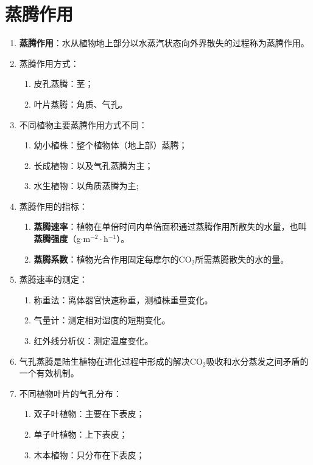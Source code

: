 \section{蒸腾作用}
\begin{enumerate}
    \item \textbf{蒸腾作用}：水从植物地上部分以水蒸汽状态向外界散失的过程称为蒸腾作用。
    \item 蒸腾作用方式：
    \begin{enumerate}
        \item 皮孔蒸腾：茎；
        \item 叶片蒸腾：角质、气孔。
    \end{enumerate}
    \item 不同植物主要蒸腾作用方式不同：
    \begin{enumerate}
        \item 幼小植株：整个植物体（地上部）蒸腾；
        \item 长成植物：以及气孔蒸腾为主；
        \item 水生植物：以角质蒸腾为主;
    \end{enumerate}
    \item 蒸腾作用的指标：
    \begin{enumerate}
        \item \textbf{蒸腾速率}：植物在单倍时间内单倍面积通过蒸腾作用所散失的水量，也叫\textbf{蒸腾强度}（g$\cdot$m$^{-2}\cdot$h$^{-1}$）。
        \item \textbf{蒸腾系数}：植物光合作用固定每摩尔的CO$_2$所需蒸腾散失的水的量。
    \end{enumerate}
    \item 蒸腾速率的测定：
    \begin{enumerate}
        \item 称重法：离体器官快速称重，测植株重量变化。
        \item 气量计：测定相对湿度的短期变化。
        \item 红外线分析仪：测定温度变化。
    \end{enumerate}
    \item 气孔蒸腾是陆生植物在进化过程中形成的解决CO$_2$吸收和水分蒸发之间矛盾的一个有效机制。
    \item 不同植物叶片的气孔分布：
    \begin{enumerate}
        \item 双子叶植物：主要在下表皮；
        \item 单子叶植物：上下表皮；
        \item 木本植物：只分布在下表皮；

\end{enumerate}
\end{enumerate}
